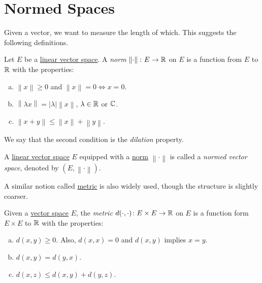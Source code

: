 \section{Normed Spaces}
Given a vector, we want to measure the length of which. This suggests the following definitions.

\begin{definition}[Norm]\label{def:norm}
	Let \(E\) be a \hyperref[def:linear-vector-space]{linear vector space}. A \emph{norm} \(\left\lVert \cdot \right\rVert \colon E \to \mathbb{\MakeUppercase{r}} \) on \(E\) is a function from \(E\) to \(\mathbb{\MakeUppercase{r}} \) with the properties:
	\begin{enumerate}[(a)]
		\item \(\left\lVert x\right\rVert \geq 0\) and \(\left\lVert x\right\rVert =0 \iff x=0\).
		\item \(\left\lVert \lambda x\right\rVert = \left\vert \lambda  \right\vert \left\lVert x\right\rVert\), \(\lambda \in\mathbb{\MakeUppercase{r}} \) or \(\mathbb{\MakeUppercase{c}} \).
		\item \(\left\lVert x+y\right\rVert \leq \left\lVert x\right\rVert + \left\lVert y\right\rVert \).
	\end{enumerate}
\end{definition}

\begin{notation}[Dilation]
	We say that the second condition is the \emph{dilation} property.
\end{notation}

\begin{definition}\label{def:normed-vector-space}
	A \hyperref[def:linear-vector-space]{linear vector space} \(E\) equipped with a \hyperref[def:norm]{norm} \(\left\lVert \cdot\right\rVert \) is called a \emph{normed vector space}, denoted by \((E, \left\lVert \cdot\right\rVert )\).
\end{definition}

A similar notion called \hyperref[def:metric]{metric} is also widely used, though the structure is slightly coarser.

\begin{prev}[Metric]\label{def:metric}
	Given a \hyperref[def:linear-vector-space]{vector space} \(E\), the \emph{metric} \(d(\cdot, \cdot)\colon E\times E\to \mathbb{\MakeUppercase{r}} \) on \(E\) is a function form \(E\times E\) to \(\mathbb{\MakeUppercase{r}} \) with the properties:
	\begin{enumerate}[(a)]
		\item \(d(x, y) \geq 0\). Also, \(d(x, x) = 0\) and \(d(x, y)\) implies \(x =y\).
		\item \(d(x, y) = d(y, x)\).
		\item \(d(x, z) \leq d(x, y) + d(y, z)\).
	\end{enumerate}
\end{prev}

